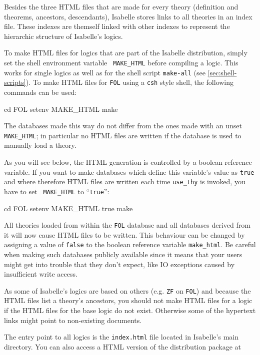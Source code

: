 Besides the three HTML files that are made for every theory
(definition and theorems, ancestors, descendants), Isabelle stores
links to all theories in an index file. These indexes are themself
linked with other indexes to represent the hierarchic structure of
Isabelle's logics.

To make HTML files for logics that are part of the Isabelle
distribution, simply set the shell environment variable {\tt
MAKE_HTML} before compiling a logic. This works for single logics as
well as for the shell script {\tt make-all} (see
\ref{sec:shell-scripts}). To make HTML files for {\tt FOL} using a
{\tt csh} style shell, the following commands can be used:

\begin{ttbox}
cd FOL
setenv MAKE_HTML
make
\end{ttbox}

The databases made this way do not differ from the ones made with an
unset {\tt MAKE_HTML}; in particular no HTML files are written if the
database is used to manually load a theory.

As you will see below, the HTML generation is controlled by a boolean
reference variable. If you want to make databases which define this
variable's value as {\tt true} and where therefore HTML files are
written each time {\tt use_thy} is invoked, you have to set {\tt
MAKE_HTML} to ``{\tt true}'':

\begin{ttbox}
cd FOL
setenv MAKE_HTML true
make
\end{ttbox}

All theories loaded from within the {\tt FOL} database and all
databases derived from it will now cause HTML files to be written.
This behaviour can be changed by assigning a value of {\tt false} to
the boolean reference variable {\tt make_html}. Be careful when making
such databases publicly available since it means that your users might
get into trouble that they don't expect, like IO exceptions caused by
insufficient write access.

As some of Isabelle's logics are based on others (e.g. {\tt ZF} on
{\tt FOL}) and because the HTML files list a theory's ancestors, you
should not make HTML files for a logic if the HTML files for the base
logic do not exist. Otherwise some of the hypertext links might point
to non-existing documents.

The entry point to all logics is the {\tt index.html} file located in
Isabelle's main directory. You can also access a HTML version of the
distribution package at

